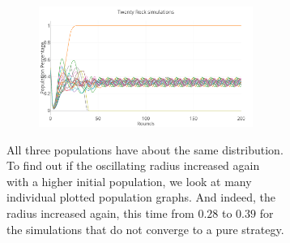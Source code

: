 \documentclass[a4paper, 11pt]{article}
\begin{document}
\begin{figure}[H]
\begin{subfigure}{.65\textwidth}
	\begin{subfigure}{1\textwidth}
		\includegraphics[width=1\linewidth]{50x50_50RockDist_IndividualRock}
	\end{subfigure}		
	
\end{subfigure}%
\begin{subfigure}{.35\textwidth}
	All three populations have about the same distribution. To find out if the oscillating radius increased again with a higher initial population, we look at many individual plotted population graphs. And indeed, the radius increased again, this time from $0.28$ to $0.39$ for the simulations that do not converge to a pure strategy.
\end{subfigure}

\end{figure}
\end{document}

